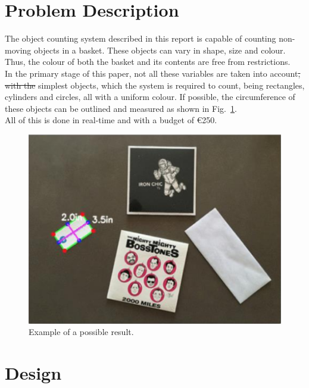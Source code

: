 \documentclass{article}
\providecommand{\DIFaddtex}[1]{{\protect\color{blue}\uwave{#1}}} %
\providecommand{\DIFdeltex}[1]{{\protect\color{red}\sout{#1}}}                      %
\providecommand{\DIFaddbegin}{} %
\providecommand{\DIFaddend}{} %
\providecommand{\DIFdelbegin}{} %
\providecommand{\DIFdelend}{} %
\providecommand{\DIFadd}[1]{\texorpdfstring{\DIFaddtex{#1}}{#1}} %
\providecommand{\DIFdel}[1]{\texorpdfstring{\DIFdeltex{#1}}{}} %
\newcommand{\DIFscaledelfig}{0.5}
\newlength{\DIFdelgraphicswidth} %
\newlength{\DIFdelgraphicsheight} %
\newcommand{\DIFaddincludegraphics}[2][]{{\color{blue}\fbox{\DIFOincludegraphics[#1]{#2}}}} %
\newcommand{\DIFdelincludegraphics}[2][]{%
\sbox{\DIFdelgraphicsbox}{\DIFOincludegraphics[#1]{#2}}%
\settoboxwidth{\DIFdelgraphicswidth}{\DIFdelgraphicsbox} %
\settoboxtotalheight{\DIFdelgraphicsheight}{\DIFdelgraphicsbox} %
\scalebox{\DIFscaledelfig}{%
\parbox[b]{\DIFdelgraphicswidth}{\usebox{\DIFdelgraphicsbox}\\[-\baselineskip] \rule{\DIFdelgraphicswidth}{0em}}\llap{\resizebox{\DIFdelgraphicswidth}{\DIFdelgraphicsheight}{%
\setlength{\unitlength}{\DIFdelgraphicswidth}%
\begin{picture}(1,1)%
\thicklines\linethickness{2pt} %
{\color[rgb]{1,0,0}\put(0,0){\framebox(1,1){}}}%
{\color[rgb]{1,0,0}\put(0,0){\line( 1,1){1}}}%
{\color[rgb]{1,0,0}\put(0,1){\line(1,-1){1}}}%
\end{picture}%
}\hspace*{3pt}}} %
} %
\DeclareRobustCommand{\DIFaddbegin}{\DIFOaddbegin \let\includegraphics\DIFaddincludegraphics} %
\DeclareRobustCommand{\DIFaddend}{\DIFOaddend \let\includegraphics\DIFOincludegraphics} %
\DeclareRobustCommand{\DIFdelbegin}{\DIFOdelbegin \let\includegraphics\DIFdelincludegraphics} %
\DeclareRobustCommand{\DIFdelend}{\DIFOaddend \let\includegraphics\DIFOincludegraphics} %
\begin{document}
\section{Problem Description}
The object counting system described in this report is capable of counting non-moving objects in a basket. These objects can vary in shape, size and colour. Thus, the colour of both the basket and its contents are free from restrictions.\\
In the primary stage of this paper, not all these variables are taken into account\DIFdelbegin \DIFdel{, with the }\DIFdelend \DIFaddbegin \DIFadd{. The }\DIFaddend simplest objects, which the system is required to count, being rectangles, cylinders and circles, all with a uniform colour. If possible, the circumference of these objects can be outlined and measured as shown in Fig.~\ref{fig:example}.\\ All of this is done in real-time and with a budget of \euro 250.
\begin{figure}[h]
\centering
\includegraphics[width=0.7\linewidth]{opdracht.png}
\caption{Example of a possible result.}
\label{fig:example}
\end{figure}

\section{Design}
\end{document}
